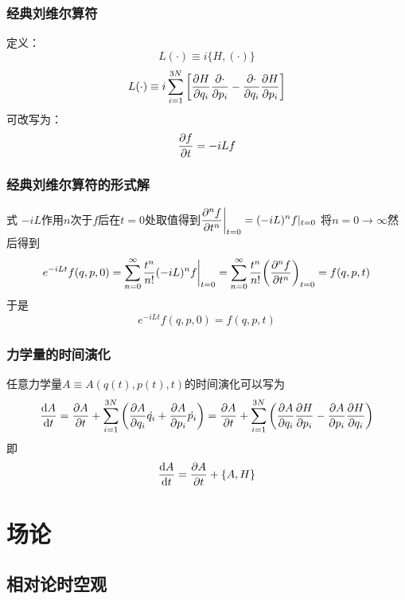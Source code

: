 \documentclass[12pt]{report}
\begin{document}
\subsection{经典刘维尔算符}
定义：
$$L(\cdot) \equiv i\{H,(\cdot)\}$$
$$L(\cdot ) \equiv i \sum_{i=1}^{3N} \qty[\pdv{H}{q_i}\pdv{\cdot}{p_i}-
    \pdv{\cdot}{q_i}\pdv{H}{p_i}]$$
可改写为：
$$\pdv{f}{t}=-iL f$$
\subsection{经典刘维尔算符的形式解}
式 $-iL$作用$n$次于$f$后在$t=0$处取值得到$\displaystyle{\pdv[n]{f}{t} \bigg|_{t=0} = (-iL)^n f |_{t=0}}$
将$n=0 \rightarrow \infty$然后得到
$$ e^{-iLt} f(q,p,0) 
    =\sum_{n=0}^{\infty} \frac{t^n}{n!}(-iL)^n f \bigg|_{t=0} 
    = \sum_{n=0}^{\infty} \frac{t^n}{n!} \qty(\pdv[n]{f}{t})_{t=0} 
    =f(q,p,t)$$
于是
$$e^{-iLt} f(q,p,0) =f(q,p,t)$$
\subsection{力学量的时间演化}
任意力学量$A\equiv A(q(t),p(t),t)$的时间演化可以写为
$$\dv{A}{t}
=\pdv{A}{t} + \sum_{i=1}^{3N} \qty(\pdv{A}{q_i}\dot{q_i}+ \pdv{A}{p_i}\dot{p_i})
= \pdv{A}{t} + \sum_{i=1}^{3N} \qty(\pdv{A}{q_i}\pdv{H}{p_i}- \pdv{A}{p_i}\pdv{H}{q_i})$$
即
$$\dv{A}{t} =\pdv{A}{t} + \{A,H\}$$
\newpage

\chapter{场论}
\section{相对论时空观}
\end{document}
